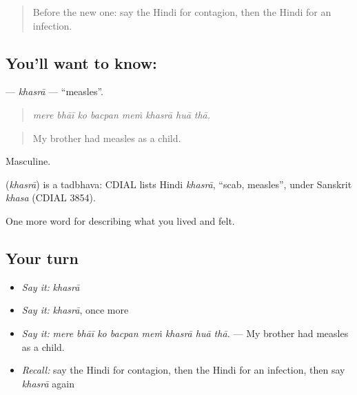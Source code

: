 \label{lesson:HI-C487-khasra}



\begin{quote}
Before the new one: say the Hindi for contagion, then the Hindi for an infection.
\end{quote}

\subsection*{You'll want to know: }
\textbf{} — \emph{khasrā} — \textquotedblleft{}measles\textquotedblright{}.

\begin{quote}
       
\end{quote}

\begin{quote}
\emph{mere bhāī ko bacpan meṁ khasrā huā thā.}
\end{quote}

\begin{quote}
My brother had measles as a child.
\end{quote}

Masculine.

\begin{cousinweb}
\textbf{} (\emph{khasrā}) is a tadbhava: CDIAL lists Hindi \emph{khasrā}, \textquotedblleft{}scab, measles\textquotedblright{}, under Sanskrit \emph{khasa} (CDIAL 3854).
\end{cousinweb}

\begin{grammarlens}[title={What you've built}]
One more word for describing what you lived and felt.
\end{grammarlens}

\subsection*{Your turn}
\begin{itemize}
\raggedright
  \item \emph{Say it:} \emph{khasrā}
  \item \emph{Say it:} \emph{khasrā}, once more
  \item \emph{Say it:} \emph{mere bhāī ko bacpan meṁ khasrā huā thā.} — My brother had measles as a child.
  \item \emph{Recall:} say the Hindi for contagion, then the Hindi for an infection, then say \emph{khasrā} again
\end{itemize}

